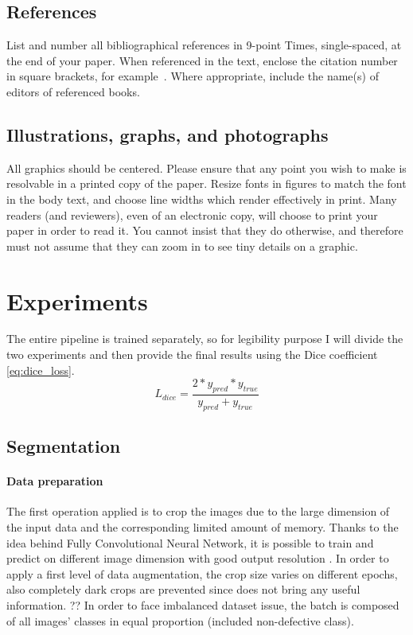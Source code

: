 \documentclass[10pt,twocolumn,letterpaper]{article}
\begin{document}
{\subsection{References}
List and number all bibliographical references in 9-point Times,
single-spaced, at the end of your paper. When referenced in the text,
enclose the citation number in square brackets, for
example~\cite{Authors14}.  Where appropriate, include the name(s) of
editors of referenced books.
\subsection{Illustrations, graphs, and photographs}
All graphics should be centered.  Please ensure that any point you wish to
make is resolvable in a printed copy of the paper.  Resize fonts in figures
to match the font in the body text, and choose line widths which render
effectively in print.  Many readers (and reviewers), even of an electronic
copy, will choose to print your paper in order to read it.  You cannot
insist that they do otherwise, and therefore must not assume that they can
zoom in to see tiny details on a graphic.}




\section{Experiments}
   The entire pipeline is trained separately, so for legibility purpose I will divide the two experiments and then provide the final results using the Dice coefficient \eqref{eq:dice_loss}.
   \begin{equation}\label{eq:dice_loss}
      L_{dice} = \frac{2 * y_{pred} * y_{true}}{y_{pred} + y_{true}}
   \end{equation}
   \subsection{Segmentation}
      \paragraph{Data preparation}
         The first operation applied is to crop the images due to the large dimension of the input data and the corresponding limited amount of memory. Thanks to the idea behind Fully Convolutional Neural Network, it is possible to train and predict on different image dimension with good output resolution \cite{FCNN}.
         In order to apply a first level of data augmentation, the crop size varies on different epochs, also completely dark crops are prevented since does not bring any useful information. ??
         In order to face imbalanced dataset issue, the batch is composed of all images' classes in equal proportion (included non-defective class).
\end{document}
